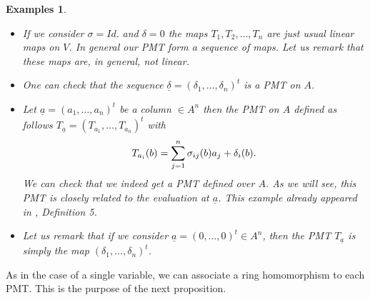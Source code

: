 \documentclass[12pt,a4paper]{article}
\newtheorem{examples}[theorem]{Examples}
\newcommand{\de}{\delta}
\newcommand{\ua}{\underline{a}}
\begin{document}
	\begin{examples}
		\label{examples of PMT}
		{\rm 
			\begin{itemize}
			
			\item[(a)] If we consider $\sigma =Id.$ and $\delta=0$ the maps $T_1, T_2,\dots , T_n$ are just usual linear maps on $V$.   In general our PMT form a sequence of maps.   Let us remark that these maps are, in general, not linear.
			\item[(b)] One can check that the sequence $\underline{\de}=(\de_1,\dots,\de_n)^t$ is a  PMT on $A$.  
			
			\item[(c)]  Let $\ua=(a_1,\dots,a_n)^t$ be a column $\in A^n$ then the 
			PMT on $A$ defined as follows $T_{\ua}=(T_{a_1},\dots,T_{a_n})^t$ with 
		\begin{equation} \label{T_{a_i}(b)}
			T_{a_i}(b)=\sum_{j=1}^n\sigma_{ij}(b)a_j + \de_i(b).
		\end{equation}
	We can check that we indeed get a PMT defined over $A$. As we will see, this PMT is closely related to the evaluation at $\ua$.  This example already appeared in \cite{MP2022}, Definition 5.
		\item[(d)] Let us remark that if we consider $ \ua = (0, \dots, 0)^t \in A^n$, then the PMT $T_{\ua}$ is simply the map $(\delta_1, \dots, \delta_n)^t $.  
		
	\end{itemize}
				
		}
	\end{examples}

\vspace{4mm}
	
	As in the case of a single variable, we can associate a ring homomorphism to each PMT.  This is the purpose of the next proposition.
	
\end{document}

